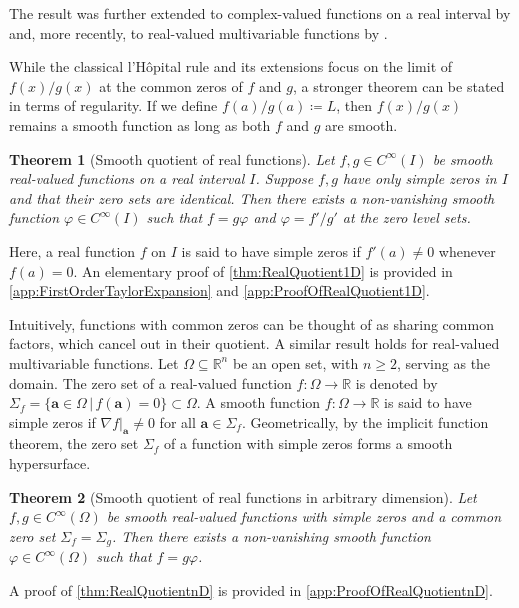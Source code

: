 \documentclass{article}
\newcommand{\Albert}[1]{{\color[rgb]{0.2,0.4,0.8}\textbf{Albert: } #1}}
\theoremstyle{theorem}
\newtheorem{theorem}{Theorem}
\theoremstyle{definition}
\def\RR{\mathbb{R}}
\def\ba{\mathbf{a}}
\begin{document}
The result was further extended to complex-valued functions on a real interval by \cite{Carter:1958:HRC} and, more recently, to real-valued multivariable functions by \cite{Lawlor:2020:HRM}. 

While the classical l'H\^opital rule and its extensions focus on the limit of \(f(x)/g(x)\) at the common zeros of \(f\) and \(g\), a stronger theorem can be stated in terms of regularity.  If we define \(f(a)/g(a)\coloneqq L\), then \(f(x)/g(x)\) remains a smooth function as long as both \(f\) and \(g\) are smooth. 
\begin{theorem}[Smooth quotient of real functions]
\label{thm:RealQuotient1D}
    Let \(f,g\in C^\infty(I)\) be smooth real-valued functions on a real interval \(I\).  Suppose \(f,g\) have only simple zeros in \(I\) and that their zero sets are identical.  Then there exists a non-vanishing smooth function \(\varphi\in C^\infty(I)\) such that \(f = g\varphi\) and $\varphi=f'/g'$ at the zero level sets.
\end{theorem}
Here, a real function \(f\) on \(I\) is said to have simple zeros if \(f'(a)\neq 0 \) whenever \(f(a) = 0\).
An elementary proof of \autoref{thm:RealQuotient1D} is provided in \autoref{app:FirstOrderTaylorExpansion} and \ref{app:ProofOfRealQuotient1D}.

Intuitively, functions with common zeros can be thought of as sharing common factors, which cancel out in their quotient.  A similar result holds for real-valued multivariable functions.  Let \(\Omega\subseteq \RR^n\) be an open set, with \(n\geq 2\), serving as the domain.  The zero set of a real-valued function \(f\colon\Omega\to\RR\) is denoted by \(\Sigma_f = \{\ba\in\Omega\,|\, f(\ba) = 0\}\subset\Omega\).
A smooth function \(f\colon\Omega\to\RR\) is said to have simple zeros if \(\nabla f|_\ba \neq 0\) for all \(\ba\in\Sigma_{f}\).  Geometrically, by the implicit function theorem, the zero set \(\Sigma_f\) of a function with simple zeros forms a smooth hypersurface.
\begin{theorem}[Smooth quotient of real functions in arbitrary dimension]
\label{thm:RealQuotientnD}
    Let \(f,g\in C^\infty(\Omega)\) be smooth real-valued functions with simple zeros and a common zero set \(\Sigma_{f} = \Sigma_{g}\).  Then there exists a non-vanishing smooth function \(\varphi\in C^\infty(\Omega)\) such that \(f = g\varphi\).
\end{theorem}
A proof of \autoref{thm:RealQuotientnD} is provided in \autoref{app:ProofOfRealQuotientnD}.
\end{document}
